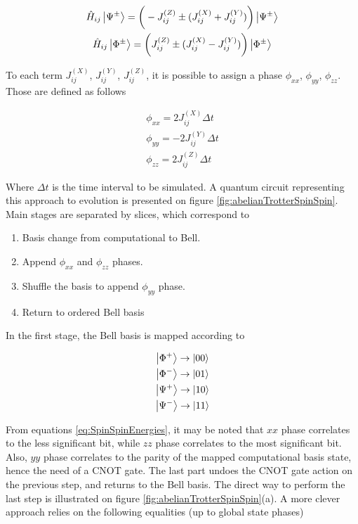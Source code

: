     \begin{gather}
      \hat{H}_{ij} \ket{\Psi^{\pm}} = \bigg(-J_{ij}^{(Z)} \pm (J_{ij}^{(X)} + J_{ij}^{(Y)})\bigg) \ket{\Psi^{\pm}} \\
      \hat{H}_{ij} \ket{\Phi^{\pm}} = \bigg(J_{ij}^{(Z)} \pm (J_{ij}^{(X)} - J_{ij}^{(Y)})\bigg) \ket{\Phi^{\pm}}
      \label{eq:SpinSpinEnergies}
    \end{gather}

    To each term $J_{ij}^{(X)}$, $J_{ij}^{(Y)}$, $J_{ij}^{(Z)}$, it is possible to assign a phase $\phi_{xx}$, $\phi_{yy}$, $\phi_{zz}$. Those are defined as follows

    \begin{gather}
      \phi_{xx} = 2 J_{ij}^{(X)} \Delta t \\
      \phi_{yy} = -2 J_{ij}^{(Y)} \Delta t \\
      \phi_{zz} = 2 J_{ij}^{(Z)} \Delta t
      \label{eq:SpinSpinPhases}
    \end{gather}
    
    Where $\Delta t$ is the time interval to be simulated. A quantum circuit representing this approach to evolution is presented on figure \ref{fig:abelianTrotterSpinSpin}. Main stages are separated by slices, which correspond to

    \begin{enumerate}
      \item Basis change from computational to Bell.
      \item Append $\phi_{xx}$ and $\phi_{zz}$ phases.
      \item Shuffle the basis to append $\phi_{yy}$ phase.
      \item Return to ordered Bell basis
    \end{enumerate}

    In the first stage, the Bell basis is mapped according to

    \begin{gather}
      \ket{\Phi^{+}} \rightarrow \ket{00} \\
      \ket{\Phi^{-}} \rightarrow \ket{01} \\
      \ket{\Psi^{+}} \rightarrow \ket{10} \\
      \ket{\Psi^{-}} \rightarrow \ket{11} 
    \end{gather}

    From equations \ref{eq:SpinSpinEnergies}, it may be noted that $xx$ phase correlates to the less significant bit, while $zz$ phase correlates to the most significant bit. Also, $yy$ phase correlates to the parity of the mapped computational basis state, hence the need of a CNOT gate. The last part undoes the CNOT gate action on the previous step, and returns to the Bell basis. The direct way to perform the last step is illustrated on figure \ref{fig:abelianTrotterSpinSpin}(a). A more clever approach relies on the following equalities (up to global state phases)

